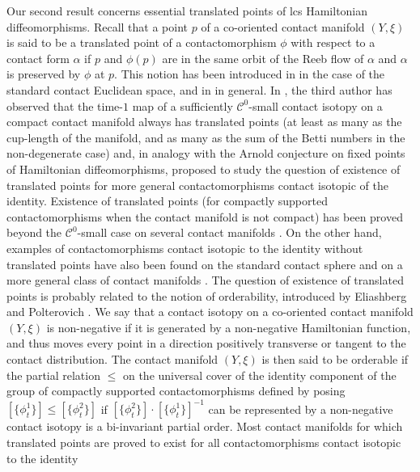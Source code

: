\documentclass{amsart}
\theoremstyle{remark}
\begin{document}
Our second result concerns essential translated points
of lcs Hamiltonian diffeomorphisms.
Recall that a point $p$ of a co-oriented contact manifold $(Y, \xi)$
is said to be a translated point of a contactomorphism $\phi$
with respect to a contact form $\alpha$
if $p$ and $\phi(p)$ are in the same orbit
of the Reeb flow of $\alpha$
and $\alpha$ is preserved by $\phi$ at $p$.
This notion has been introduced in \cite{Bhupal, San11}
in the case of the standard contact Euclidean space,
and in \cite{S - Morse estimate for translated points, S - Iterated} in general.
In \cite{S - Morse estimate for translated points, S - Iterated},
the third author has observed
that the time-$1$ map of a sufficiently $\mathcal{C}^0$-small
contact isotopy
on a compact contact manifold
always has translated points
(at least as many as the cup-length of the manifold,
and as many as the sum of the Betti numbers
in the non-degenerate case)
and,
in analogy with the  Arnold conjecture
on fixed points of Hamiltonian diffeomorphisms,
proposed to study the question
of existence of translated points
for more general contactomorphisms
contact isotopic of the identity.
Existence of translated points
(for compactly supported contactomorphisms
when the contact manifold is not compact)
has been proved beyond the $\mathcal{C}^0$-small case
on several contact manifolds
\cite{S - Morse estimate for translated points, S - Iterated,
AM, AFM, Shelukhin, MN, MU, GKPS, Tervil, Allais lens, Allais unit tangent bundles, AArl}.
On the other hand,
examples of contactomorphisms contact isotopic to the identity
without translated points
have also been found
on the standard contact sphere \cite{Cant}
and on a more general class of contact manifolds \cite{HS}.
The question of existence of translated points
is probably related to the notion of orderability,
introduced by Eliashberg and Polterovich \cite{EP}.
We say that a contact isotopy on a co-oriented contact manifold $(Y, \xi)$
is non-negative if it is generated by a non-negative Hamiltonian function,
and thus moves every point in a direction positively transverse
or tangent to the contact distribution.
The contact manifold $(Y, \xi)$
is then said to be orderable if the partial relation $\leq$
on the universal cover of the identity component of the group
of compactly supported contactomorphisms
defined by posing  $[\{\phi_t^{1}\}] \leq [\{\phi_t^{2}\}]$
if $[\{\phi_t^{2}\}] \cdot [\{\phi_t^{1}\}]^{-1}$
can be represented by a non-negative contact isotopy
is a bi-invariant partial order.
Most contact manifolds for which translated points
are proved to exist for all contactomorphisms contact isotopic to the identity
\end{document}
